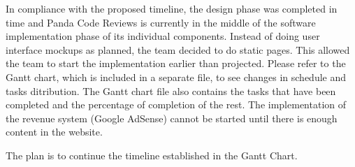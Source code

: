 

In compliance with the proposed timeline, the design phase was completed in time and Panda Code Reviews is currently in the middle of the software implementation phase of its individual components. Instead of doing user interface mockups as planned, the team decided to do static
pages. This allowed the team to start the implementation earlier than projected. Please refer
to the Gantt chart, which is included in a separate file, to see changes in
schedule and tasks ditribution. The Gantt chart file also contains the tasks that have been completed and the percentage of completion of the rest. The implementation of the revenue system (Google AdSense) cannot be started until there is enough content in the website.

The plan is to continue the timeline established in the Gantt Chart. 
